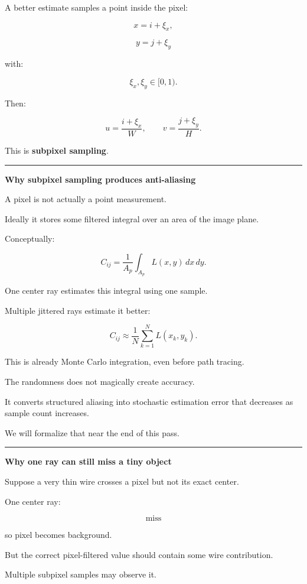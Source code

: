 A better estimate samples a point inside the pixel:

\[
x=i+\xi_x,
\]

\[
y=j+\xi_y
\]

with:

\[
\xi_x,\xi_y\in[0,1).
\]

Then:

\[
u=
\frac{i+\xi_x}{W},
\qquad
v=
\frac{j+\xi_y}{H}.
\]

This is \textbf{subpixel sampling}.

\begin{center}\rule{0.5\linewidth}{0.5pt}\end{center}

\textbf{Why subpixel sampling produces anti-aliasing}

A pixel is not actually a point measurement.

Ideally it stores some filtered integral over an area of the image plane.

Conceptually:

\[
C_{ij}
=
\frac{1}{A_p}
\int_{A_p}
L(x,y)
\,dx\,dy.
\]

One center ray estimates this integral using one sample.

Multiple jittered rays estimate it better:

\[
\boxed{
C_{ij}
\approx
\frac1N
\sum_{k=1}^{N}
L(x_k,y_k).
}
\]

This is already Monte Carlo integration, even before path tracing.

The randomness does not magically create accuracy.

It converts structured aliasing into stochastic estimation error that decreases as sample count increases.

We will formalize that near the end of this pass.

\begin{center}\rule{0.5\linewidth}{0.5pt}\end{center}

\textbf{Why one ray can still miss a tiny object}

Suppose a very thin wire crosses a pixel but not its exact center.

One center ray:

\[
\text{miss}
\]

so pixel becomes background.

But the correct pixel-filtered value should contain some wire contribution.

Multiple subpixel samples may observe it.

